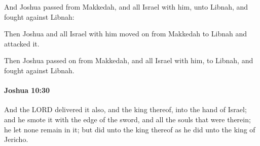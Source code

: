 			\begin{versebox}
					\item[BHS] 
					\item[ASV] And Joshua passed from Makkedah, and all Israel with him, unto Libnah, and fought against Libnah:
					\item[NIV] Then Joshua and all Israel with him moved on from Makkedah to Libnah and attacked it.
					\item[NRSV] Then Joshua passed on from Makkedah, and all Israel with him, to Libnah, and fought against Libnah.
			\end{versebox}

		\paragraph{Joshua 10:30} %
			\label{JOSHUA-10-30}

			And the LORD delivered it also, and the king thereof, into the hand of Israel; and he smote it with the edge of the sword, and all the souls that were therein; he let none remain in it; but did unto the king thereof as he did unto the king of Jericho.


